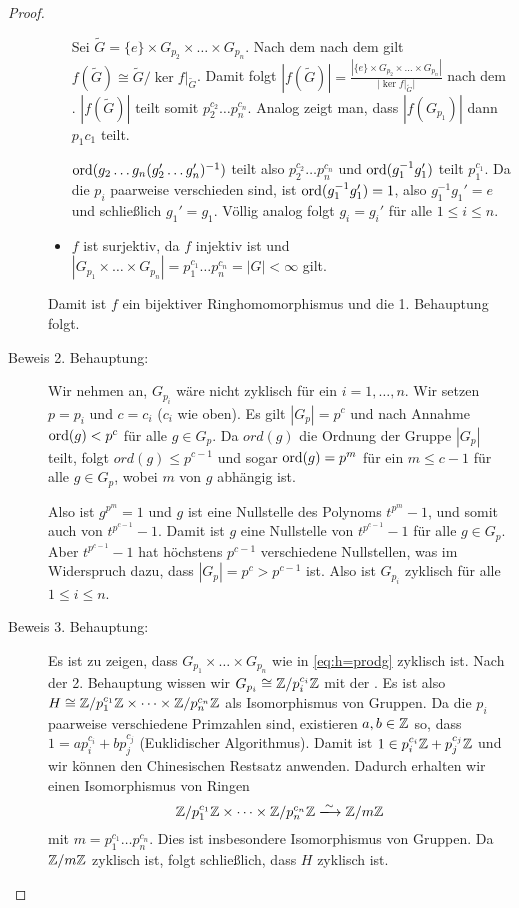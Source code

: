 \documentclass[12pt,a4paper]{scrartcl}
\begin{document}
\begin{proof}
\begin{description}
\begin{itemize}
			Sei $\tilde{G} = \{e\}\times G_{p_2}\times\dots\times G_{p_n}$.  Nach dem nach dem  gilt $f(\tilde{G})\cong \tilde {G}/\ker f|_{\tilde{G}}$. Damit folgt $|f(\tilde{G})| = \frac{|\{e\}\times G_{p_2}\times\dots\times G_{p_n}|}{|\ker f|_{\tilde{G}}|}$ nach dem . $|f(\tilde{G})|$ teilt somit $p_2^{c_2}\dots p_n^{c_n}$. Analog zeigt man, dass $|f(G_{p_1})|$ dann $p_1{c_1}$ teilt. 
			
			$\operatorname{ord} (g_2\dots g_n(g_2'\dots g_n')^{-1})$ teilt also $p_2^{c_2}\dots p_n^{c_n}$ und $\operatorname{ord}(g_1^{-1}g_1')$ teilt $p_1^{c_1}$. Da die $p_i$ paarweise verschieden sind, ist $\operatorname{ord}(g_1^{-1}g_1') = 1$, also $g_1^{-1}g_1' = e$ und schließlich $g_1' = g_1$. Völlig analog folgt $g_i = g_i'$ für alle $1\leq i\leq n$.
			\item $f$ ist surjektiv, da $f$ injektiv  ist und $|G_{p_1}\times\dots\times G_{p_n}| = p_1^{c_1}\dots p_n^{c_n} = |G|<\infty$ gilt.
		\end{itemize}
	Damit ist $f$ ein bijektiver Ringhomomorphismus und die 1. Behauptung folgt.
	\item[Beweis 2. Behauptung:] Wir nehmen an, $G_{p_i}$ wäre nicht zyklisch für ein $i=1,\dots,n$. Wir setzen $p = p_i$ und $c = c_i$ ($c_i$ wie oben). Es gilt $|G_p| = p^c$ und nach Annahme $\operatorname{ord}(g)<p^c$ für alle $g\in G_p$. Da $ord(g)$ die Ordnung der Gruppe $|G_p|$ teilt, folgt $ord(g)\leq p^{c-1}$ und sogar $\operatorname{ord}(g) = p^m$ für ein $m\leq c-1$ für alle $g\in G_p$, wobei $m$ von $g$ abhängig ist.
	
	Also ist $g^{p^m} = 1$ und $g$ ist eine Nullstelle des Polynoms $t^{p^m}-1$, und somit auch von $t^{p^{c-1}}-1$. Damit ist $g$ eine Nullstelle von $t^{p^{c-1}}-1$ für alle $g\in G_p$. Aber $t^{p^{c-1}}-1$ hat höchstens $p^{c-1}$ verschiedene Nullstellen, was im Widerspruch dazu, dass $|G_p| = p^c> p^{c-1}$ ist. Also ist $G_{p_i}$ zyklisch für alle $1\leq i\leq n$.
	\item[Beweis 3. Behauptung:] Es ist zu zeigen, dass $G_{p_1}\times\dots\times G_{p_n}$ wie in \eqref{eq:h=prodg} zyklisch ist. Nach der 2. Behauptung wissen wir $G_{p_i}\cong \mathbb Z/p_i^{c_i}\mathbb Z$ mit der . Es ist also $H\cong \mathbb Z/p_1^{c_1} \mathbb Z\times\dots \times \mathbb Z/p_n^{c_n}\mathbb Z$ als Isomorphismus von Gruppen. Da die $p_i$ paarweise verschiedene Primzahlen sind, existieren $a,b\in\mathbb Z$ so, dass $1 = ap_i^{c_i}+bp_j^{c_j}$ (Euklidischer Algorithmus). Damit ist $1\in p_i^{c_i}\mathbb Z+p_j^{c_j}\mathbb Z$ und wir können den Chinesischen Restsatz anwenden. Dadurch erhalten wir einen Isomorphismus von Ringen
	$$\IZ/p_1^{c_1}\IZ\times\dots \times\IZ/p_n^{c_n}\IZ \xlongrightarrow{\sim} \IZ/m\IZ$$
	mit $m = p_1^{c_1}\dots p_n^{c_n}$. Dies ist insbesondere Isomorphismus von Gruppen. Da $\mathbb Z/m\mathbb Z$ zyklisch ist, folgt schließlich, dass $H$ zyklisch ist.
\end{description}
\end{proof}
\end{document}
